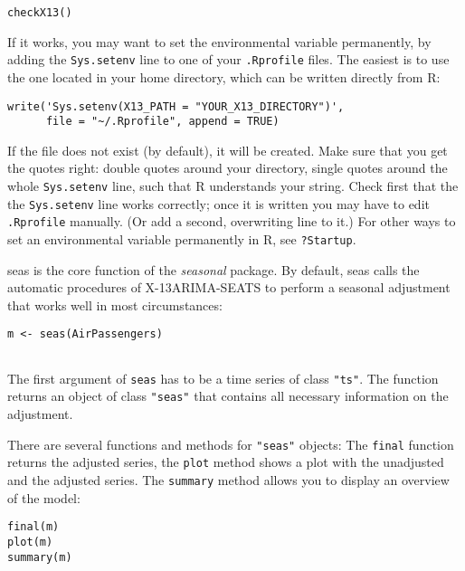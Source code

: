 \begin{verbatim}
checkX13()
\end{verbatim}

If it works, you may want to set the environmental variable permanently,
by adding the \texttt{Sys.setenv} line to one of your \texttt{.Rprofile}
files. The easiest is to use the one located in your home directory,
which can be written directly from R:

\begin{verbatim}
write('Sys.setenv(X13_PATH = "YOUR_X13_DIRECTORY")', 
      file = "~/.Rprofile", append = TRUE)
\end{verbatim}

If the file does not exist (by default), it will be created. Make sure
that you get the quotes right: double quotes around your directory,
single quotes around the whole \texttt{Sys.setenv} line, such that R
understands your string. Check first that the the \texttt{Sys.setenv}
line works correctly; once it is written you may have to edit
\texttt{.Rprofile} manually. (Or add a second, overwriting line to it.)
For other ways to set an environmental variable permanently in R, see
\texttt{?Startup}.


seas is the core function of the \emph{seasonal} package. By default,
seas calls the automatic procedures of X-13ARIMA-SEATS to perform a
seasonal adjustment that works well in most circumstances:

\begin{verbatim}
m <- seas(AirPassengers)
 
\end{verbatim}

The first argument of \texttt{seas} has to be a time series of class
\texttt{"ts"}. The function returns an object of class \texttt{"seas"}
that contains all necessary information on the adjustment.

There are several functions and methods for \texttt{"seas"} objects: The
\texttt{final} function returns the adjusted series, the \texttt{plot}
method shows a plot with the unadjusted and the adjusted series. The
\texttt{summary} method allows you to display an overview of the model:

\begin{verbatim}
final(m)
plot(m)
summary(m)
\end{verbatim}

